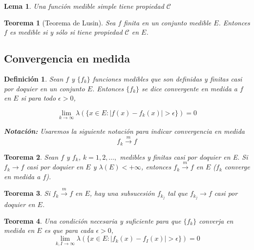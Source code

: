 \documentclass{article}
\newtheorem{theorem}{Teorema}
\newtheorem{lemma}{Lema}
\newtheorem{definition}{Definición}
\begin{document}
\begin{lemma}
\label{lema:ejercicio}
Una función medible simple tiene propiedad $\mathscr{C}$
\end{lemma}

\begin{theorem}[Teorema de Lusin]
Sea $f$ finita en un conjunto medible $E$. Entonces $f$ es medible si y sólo si tiene propiedad $\mathscr{C}$ en $E$.
\end{theorem}

\subsection{Convergencia en medida}
\begin{definition}
Sean $f$ y $\{f_k\}$ funciones medibles que son definidas y finitas casi por doquier en un conjunto $E$. Entonces $\{f_k\}$ se dice convergente en medida a $f$ en $E$ si para todo $\epsilon > 0$, 

\begin{equation}
\lim_{k \to \infty} \lambda(\{x \in E: |f(x) - f_k(x)| > \epsilon\}) = 0
\end{equation}

\textbf{Notación:} Usaremos la siguiente notación para indicar convergencia en medida 
\begin{equation}
f_k \xrightarrow{m} f
\end{equation}

\end{definition}

\begin{theorem}
Sean $f$ y $f_k$, $k=1,2, \ldots,$ medibles y finitas casi por doquier en E. Si $f_k \rightarrow f$ casi por doquier en $E$ y $\lambda(E) < +\infty$, entonces $f_k \xrightarrow{m} f$ en $E$ ($f_k$ converge en medida a $f$).
\end{theorem}

\begin{theorem}
Si $f_k \xrightarrow{m} f$ en $E$, hay una subsucesión $f_{k_j}$ tal que $f_{k_j} \rightarrow f$ casi por doquier en $E$.
\end{theorem}

\begin{theorem}
Una condición necesaria y suficiente para que $\{f_k\}$ converja en medida en $E$ es que para cada $\epsilon > 0$, 
\begin{equation}
\lim_{k,I \to \infty} \lambda(\{x \in E : |f_k(x) - f_I(x)| > \epsilon \}) = 0
\end{equation}
\end{theorem}
\end{document}

